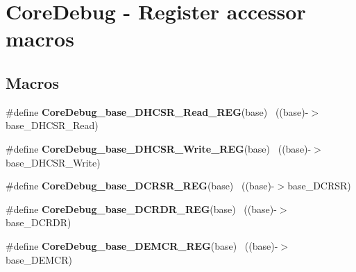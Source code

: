 \hypertarget{group___core_debug___register___accessor___macros}{}\section{Core\+Debug -\/ Register accessor macros}
\label{group___core_debug___register___accessor___macros}
\subsection*{Macros}
\begin{DoxyCompactItemize}
\item 
\hypertarget{group___core_debug___register___accessor___macros_gaea44925e7b9cc3155d55c86d77ecb8dc}{}\#define {\bfseries Core\+Debug\+\_\+base\+\_\+\+D\+H\+C\+S\+R\+\_\+\+Read\+\_\+\+R\+E\+G}(base)        ~((base)-\/$>$base\+\_\+\+D\+H\+C\+S\+R\+\_\+\+Read)\label{group___core_debug___register___accessor___macros_gaea44925e7b9cc3155d55c86d77ecb8dc}

\item 
\hypertarget{group___core_debug___register___accessor___macros_gaf54a5a2086e1362b034c5ae9d566f261}{}\#define {\bfseries Core\+Debug\+\_\+base\+\_\+\+D\+H\+C\+S\+R\+\_\+\+Write\+\_\+\+R\+E\+G}(base)      ~((base)-\/$>$base\+\_\+\+D\+H\+C\+S\+R\+\_\+\+Write)\label{group___core_debug___register___accessor___macros_gaf54a5a2086e1362b034c5ae9d566f261}

\item 
\hypertarget{group___core_debug___register___accessor___macros_ga5f44f54e6c3b28720c9f888292d2eef5}{}\#define {\bfseries Core\+Debug\+\_\+base\+\_\+\+D\+C\+R\+S\+R\+\_\+\+R\+E\+G}(base)                  ~((base)-\/$>$base\+\_\+\+D\+C\+R\+S\+R)\label{group___core_debug___register___accessor___macros_ga5f44f54e6c3b28720c9f888292d2eef5}

\item 
\hypertarget{group___core_debug___register___accessor___macros_gac60388e54792a5460ba042a1e6917ce7}{}\#define {\bfseries Core\+Debug\+\_\+base\+\_\+\+D\+C\+R\+D\+R\+\_\+\+R\+E\+G}(base)                  ~((base)-\/$>$base\+\_\+\+D\+C\+R\+D\+R)\label{group___core_debug___register___accessor___macros_gac60388e54792a5460ba042a1e6917ce7}

\item 
\hypertarget{group___core_debug___register___accessor___macros_ga068f04cd2820bf5a12caeb1c9f6afa51}{}\#define {\bfseries Core\+Debug\+\_\+base\+\_\+\+D\+E\+M\+C\+R\+\_\+\+R\+E\+G}(base)                  ~((base)-\/$>$base\+\_\+\+D\+E\+M\+C\+R)\label{group___core_debug___register___accessor___macros_ga068f04cd2820bf5a12caeb1c9f6afa51}


\end{DoxyCompactItemize}
